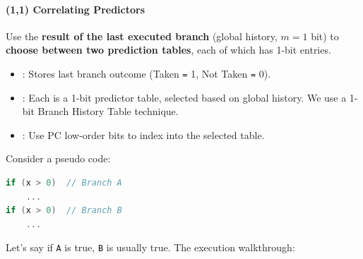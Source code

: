 \paragraph{(1,1) Correlating Predictors}

Use the \textbf{result of the last executed branch} (global history, $m = 1$ bit) to \textbf{choose between two prediction tables}, each of which has 1-bit entries.
\begin{itemize}
    \item {}: Stores last branch outcome (Taken \texttt{=} 1, Not Taken \texttt{=} 0).
    \item {}: Each is a 1-bit predictor table, selected based on global history. We use a 1-bit Branch History Table technique.
    \item {}: Use PC low-order bits to index into the selected table.
\end{itemize}
Consider a pseudo code:
\begin{lstlisting}[language=c]
if (x > 0)  // Branch A
    ...
if (x > 0)  // Branch B
    ...
\end{lstlisting}
Let's say if \texttt{A} is true, \texttt{B} is usually true. The execution walkthrough:
